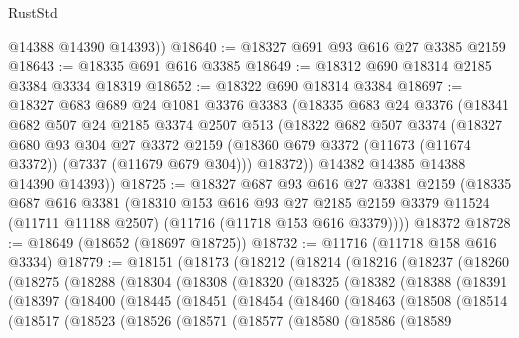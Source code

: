 \begin{lexlean}{RustStd}
\begin{coremodule}
        @14388
        @14390
        @14393))
@18640 := @18327 @691 @93 @616 @27 @3385 @2159
@18643 := @18335 @691 @616 @3385
@18649 := @18312 @690 @18314 @2185 @3384 @3334 @18319
@18652 := @18322 @690 @18314 @3384
@18697 := @18327
    @683
    @689
    @24
    @1081
    @3376
    @3383
    (@18335
      @683
      @24
      @3376
      (@18341
        @682
        @507
        @24
        @2185
        @3374
        @2507
        @513
        (@18322
          @682
          @507
          @3374
          (@18327
            @680
            @93
            @304
            @27
            @3372
            @2159
            (@18360 @679 @3372 (@11673 (@11674 @3372)) (@7337 (@11679 @679 @304)))
            @18372))
        @14382
        @14385
        @14388
        @14390
        @14393))
@18725 := @18327
    @687
    @93
    @616
    @27
    @3381
    @2159
    (@18335
      @687
      @616
      @3381
      (@18310
        @153
        @616
        @93
        @27
        @2185
        @2159
        @3379
        @11524
        (@11711 @11188 @2507)
        (@11716 (@11718 @153 @616 @3379))))
    @18372
@18728 := @18649 (@18652 (@18697 @18725))
@18732 := @11716 (@11718 @158 @616 @3334)
@18779 := @18151
    (@18173
      (@18212
        (@18214
          (@18216
            (@18237
              (@18260
                (@18275
                  (@18288
                    (@18304
                      (@18308
                        (@18320
                          (@18325
                            (@18382
                              (@18388
                                (@18391
                                  (@18397
                                    (@18400
                                      (@18445
                                        (@18451
                                          (@18454
                                            (@18460
                                              (@18463
                                                (@18508
                                                  (@18514
                                                    (@18517
                                                      (@18523
                                                        (@18526
                                                          (@18571
                                                            (@18577
                                                              (@18580
                                                                (@18586
                                                                  (@18589

\end{coremodule}
\end{lexlean}
